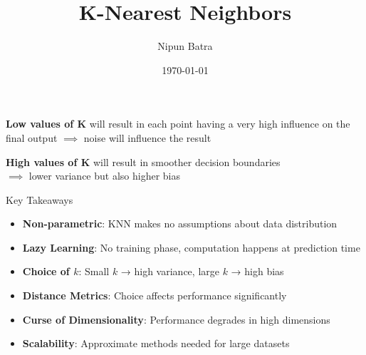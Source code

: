 \documentclass[usenames,dvipsnames]{beamer}
\title{K-Nearest Neighbors}
\date{\today}
\author{Nipun Batra}
\institute{IIT Gandhinagar}
\begin{document}
\maketitle

\begin{frame}\textbf{Low values of K} will result in each point having a very high influence on the final output $\implies$ noise will influence the result
\pause

\textbf{High values of K} will result in smoother decision boundaries \\$\implies$ lower variance but also higher bias
\end{frame}


\begin{frame}{Key Takeaways}
\begin{itemize}
\item \textbf{Non-parametric}: KNN makes no assumptions about data distribution
\pause
\item \textbf{Lazy Learning}: No training phase, computation happens at prediction time
\pause
\item \textbf{Choice of $k$}: Small $k$ → high variance, large $k$ → high bias
\pause
\item \textbf{Distance Metrics}: Choice affects performance significantly
\pause
\item \textbf{Curse of Dimensionality}: Performance degrades in high dimensions
\pause
\item \textbf{Scalability}: Approximate methods needed for large datasets
\end{itemize}
\end{frame}
\end{document}
